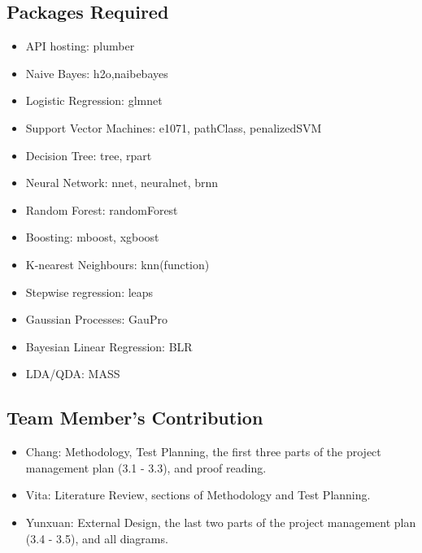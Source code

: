 \documentclass[a4paper, 12pt]{article}
\begin{document}
\subsection{Packages Required}
    \begin{itemize}
    \item API hosting: plumber
    \item Naive Bayes: h2o,naibebayes 
    \item Logistic Regression: glmnet
    \item Support Vector Machines: e1071, pathClass, penalizedSVM
    \item Decision Tree: tree, rpart
    \item Neural Network: nnet, neuralnet, brnn
    \item Random Forest: randomForest
    \item Boosting: mboost, xgboost
    \item K-nearest Neighbours: knn(function)
    \item Stepwise regression: leaps
    \item Gaussian Processes: GauPro
    \item Bayesian Linear Regression: BLR
    \item LDA/QDA: MASS
    \end{itemize}
    
\subsection{Team Member's Contribution}
\begin{itemize}
\item Chang: Methodology, Test Planning, the first three parts of the project management plan (3.1 - 3.3), and proof reading.
\item Vita: Literature Review, sections of Methodology and Test Planning.
\item Yunxuan: External Design, the last two parts of the project management plan (3.4 - 3.5), and all diagrams.
\end{itemize}
\end{document}
